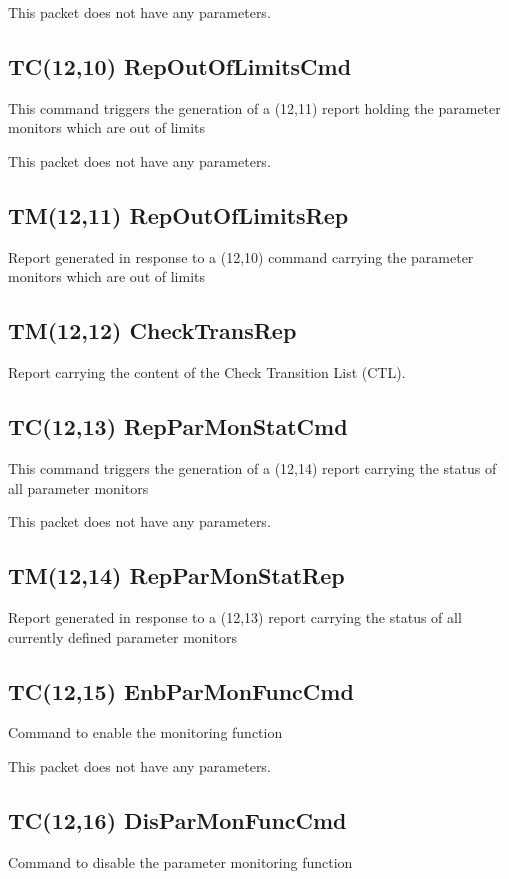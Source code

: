 This packet does not have any parameters.

\pagebreak
\subsection{TC(12,10) RepOutOfLimitsCmd}
This command triggers the generation of a (12,11) report holding the parameter monitors which are out of limits

This packet does not have any parameters.

\pagebreak
\subsection{TM(12,11) RepOutOfLimitsRep}
Report generated in response to a (12,10) command carrying the parameter monitors which are out of limits

\pagebreak
\subsection{TM(12,12) CheckTransRep}
Report carrying the content of the Check Transition List (CTL).

\pagebreak
\subsection{TC(12,13) RepParMonStatCmd}
This command triggers the generation of a (12,14) report carrying the status of all parameter monitors

This packet does not have any parameters.

\pagebreak
\subsection{TM(12,14) RepParMonStatRep}
Report generated in response to a (12,13) report carrying the status of all currently defined parameter monitors

\pagebreak
\subsection{TC(12,15) EnbParMonFuncCmd}
Command to enable the monitoring function

This packet does not have any parameters.

\pagebreak
\subsection{TC(12,16) DisParMonFuncCmd}
Command to disable the parameter monitoring function

